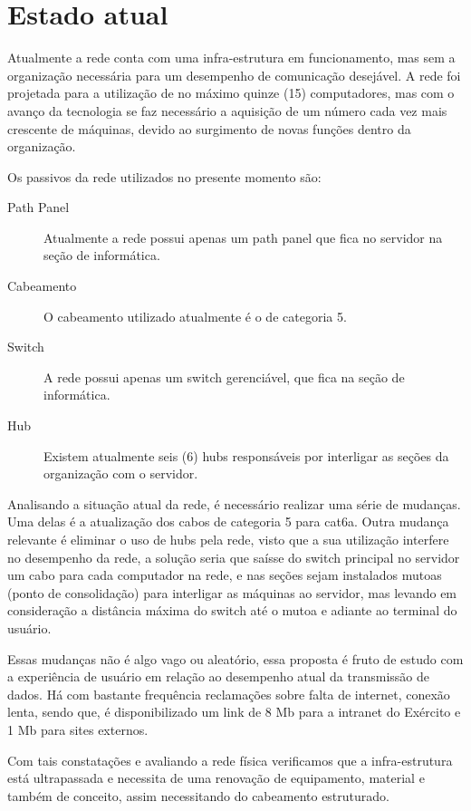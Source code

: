 \documentclass[12pt, a4paper]{article}
\begin{document}
	\section{Estado atual}
	Atualmente a rede conta com uma infra-estrutura em funcionamento, mas sem a organização necessária para um desempenho de comunicação desejável. A rede foi projetada para a utilização de no máximo quinze (15) computadores, mas com o avanço da tecnologia se faz necessário a aquisição de um número cada vez mais crescente de máquinas, devido ao surgimento de novas funções dentro da organização.
	\par
	Os passivos da rede utilizados no presente momento são:
	\begin{description}
		\item[Path Panel] Atualmente a rede possui apenas um path panel que fica no servidor na seção de informática.
		\item[Cabeamento] O cabeamento utilizado atualmente é o de categoria 5.
		\item[Switch] A rede possui apenas um switch gerenciável, que fica na seção de informática.
		\item[Hub] Existem atualmente seis (6) hubs responsáveis por interligar as seções da organização com o servidor.
	\end{description}
	\par
	Analisando a situação atual da rede, é necessário realizar uma série de mudanças. Uma delas é a atualização dos cabos de categoria 5 para cat6a. Outra mudança relevante é eliminar o uso de hubs pela rede, visto que a sua utilização interfere no desempenho da rede, a solução seria que saísse do switch principal no servidor um cabo para cada computador na rede, e nas seções sejam instalados mutoas (ponto de consolidação) para interligar as máquinas ao servidor, mas levando em consideração a distância máxima do switch até o mutoa e adiante ao terminal do usuário.
	\par 
	Essas mudanças não é algo vago ou aleatório, essa proposta é fruto de estudo com a experiência de usuário em relação ao desempenho atual da transmissão de dados. Há com bastante frequência reclamações sobre falta de internet, conexão lenta, sendo que, é disponibilizado um link de 8 Mb para a intranet do Exército e 1 Mb para sites externos.
	\par 
	Com tais constatações e avaliando a rede física verificamos que a infra-estrutura está ultrapassada e necessita de uma renovação de equipamento, material e também de conceito, assim necessitando do cabeamento estruturado.
	
\end{document}

